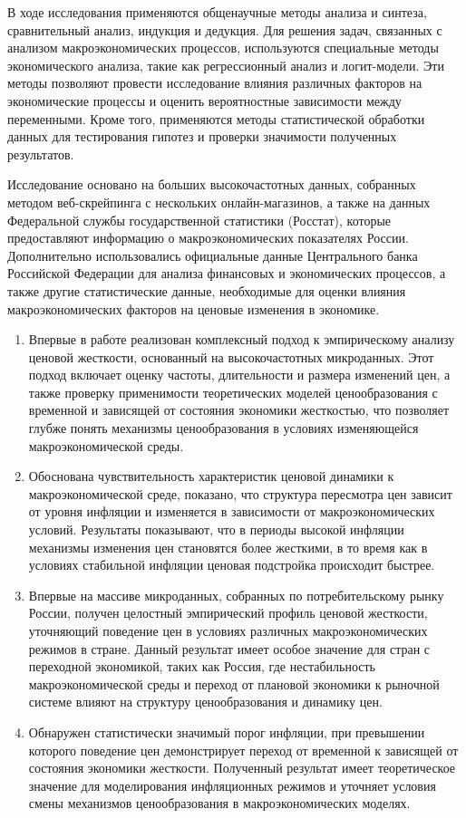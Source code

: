 {\methods} В ходе исследования применяются общенаучные методы анализа и синтеза, сравнительный анализ, индукция и дедукция. Для решения задач, связанных с анализом макроэкономических процессов, используются специальные методы экономического анализа, такие как регрессионный анализ и логит-модели. Эти методы позволяют провести исследование влияния различных факторов на экономические процессы и оценить вероятностные зависимости между переменными. Кроме того, применяются методы статистической обработки данных для тестирования гипотез и проверки значимости полученных результатов.

{\info} Исследование основано на больших высокочастотных данных, собранных методом веб-скрейпинга с нескольких онлайн-магазинов, а также на данных Федеральной службы государственной статистики (Росстат), которые предоставляют информацию о макроэкономических показателях России. Дополнительно использовались официальные данные Центрального банка Российской Федерации для анализа финансовых и экономических процессов, а также другие статистические данные, необходимые для оценки влияния макроэкономических факторов на ценовые изменения в экономике.

{\novelty}
\begin{enumerate}[beginpenalty=10000]
	\item Впервые в работе реализован комплексный подход к эмпирическому анализу ценовой жесткости, основанный на высокочастотных микроданных. Этот подход включает оценку частоты, длительности и размера изменений цен, а также проверку применимости теоретических моделей ценообразования с временной и зависящей от состояния экономики жесткостью, что позволяет глубже понять механизмы ценообразования в условиях изменяющейся макроэкономической среды.
	
	\item Обоснована чувствительность характеристик ценовой динамики к макроэкономической среде, показано, что структура пересмотра цен зависит от уровня инфляции и изменяется в зависимости от макроэкономических условий. Результаты показывают, что в периоды высокой инфляции механизмы изменения цен становятся более жесткими, в то время как в условиях стабильной инфляции ценовая подстройка происходит быстрее.
	
	\item Впервые на массиве микроданных, собранных по потребительскому рынку России, получен целостный эмпирический профиль ценовой жесткости, уточняющий поведение цен в условиях различных макроэкономических режимов в стране. Данный результат имеет особое значение для стран с переходной экономикой, таких как Россия, где нестабильность макроэкономической среды и переход от плановой экономики к рыночной системе влияют на структуру ценообразования и динамику цен.
	
	\item Обнаружен статистически значимый порог инфляции, при превышении которого поведение цен демонстрирует переход от временной к зависящей от состояния экономики жесткости. Полученный результат имеет теоретическое значение для моделирования инфляционных режимов и уточняет условия смены механизмов ценообразования в макроэкономических моделях.
	
\end{enumerate}

